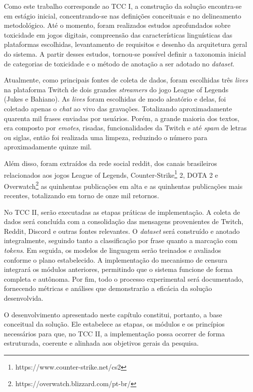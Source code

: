 \documentclass{eic-bcc-tcc}
\begin{document}
Como este trabalho corresponde ao TCC I, a construção da solução encontra-se em estágio inicial, concentrando-se nas definições conceituais e no delineamento metodológico. Até o momento, foram realizados estudos aprofundados sobre toxicidade em jogos digitais, compreensão das características linguísticas das plataformas escolhidas, levantamento de requisitos e desenho da arquitetura geral do sistema. A partir desses estudos, tornou-se possível definir a taxonomia inicial de categorias de toxicidade e o método de anotação a ser adotado no \textit{dataset}. 

Atualmente, como principais fontes de coleta de dados, foram escolhidas três \textit{lives} na plataforma Twitch de dois grandes \textit{streamers} do jogo League of Legends (Jukes e Bahiano). As \textit{lives} foram escolhidas de modo aleatório e delas, foi coletado apenas o \textit{chat} ao vivo das gravações. Totalizando aproximadamente quarenta mil frases enviadas por usuários. Porém, a grande maioria dos textos, era composto por \textit{emotes}, risadas, funcionalidades da Twitch e até \textit{spam} de letras ou siglas, então foi realizada uma limpeza, reduzindo o número para aproximadamente quinze mil.

Além disso, foram extraídos da rede social reddit, dos canais brasileiros relacionados aos jogos League of Legends, Counter-Strike\footnote{https://www.counter-strike.net/cs2} 2, DOTA 2 e Overwatch\footnote{https://overwatch.blizzard.com/pt-br/} as quinhentas publicações em alta e as quinhentas publicações mais recentes, totalizando em torno de onze mil retornos. 

No TCC II, serão executadas as etapas práticas de implementação. A coleta de dados será concluída com a consolidação das mensagens provenientes de Twitch, Reddit, Discord e outras fontes relevantes. O \textit{dataset} será construído e anotado integralmente, seguindo tanto a classificação por frase quanto a marcação com \textit{tokens}. Em seguida, os modelos de linguagem serão treinados e avaliados conforme o plano estabelecido. A implementação do mecanismo de censura integrará os módulos anteriores, permitindo que o sistema funcione de forma completa e autônoma. Por fim, todo o processo experimental será documentado, fornecendo métricas e análises que demonstrarão a eficácia da solução desenvolvida.

O desenvolvimento apresentado neste capítulo constitui, portanto, a base conceitual da solução. Ele estabelece as etapas, os módulos e os princípios necessários para que, no TCC II, a implementação possa ocorrer de forma estruturada, coerente e alinhada aos objetivos gerais da pesquisa.
\end{document}
